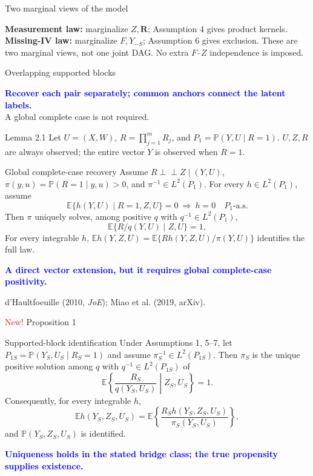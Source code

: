 \documentclass[aspectratio=169,10pt]{beamer}
\newcommand{\slidebody}{\fontsize{10.6pt}{12.6pt}\selectfont}
\newcommand{\slideannotation}{\fontsize{8pt}{9.6pt}\selectfont}
\renewcommand{\small}{\slidebody}
\renewcommand{\footnotesize}{\slidebody}
\newcommand{\E}{\mathbb E}
\newcommand{\Prb}{\mathbb P}
\newcommand{\indep}{\mathrel{\perp\!\!\!\perp}}
\newcommand{\bluekey}[1]{\textcolor{Blue}{\textbf{#1}}}
\newenvironment{theorembox}[1]{\begin{block}{#1}}{\end{block}}
\begin{document}
\begin{frame}{Two marginal views of the model}
\centering

\medskip
\raggedright
\textbf{Measurement law:} marginalize $Z,\bm R$; Assumption 4 gives product kernels.\\
\textbf{Missing-IV law:} marginalize $F,Y_{-S}$; Assumption 6 gives exclusion.
{\slideannotation These are two marginal views, not one joint DAG. No extra $F$--$Z$ independence is imposed.}
\end{frame}

\begin{frame}{Overlapping supported blocks}
\centering

\medskip
\bluekey{Recover each pair separately; common anchors connect the latent labels.}\\
A global complete case is not required.
\end{frame}



\begin{frame}{Lemma 2.1}
\small
Let $U=(X,W)$, $R=\prod_{j=1}^mR_j$, and $P_1=\Prb(Y,U\mid R=1)$.
$U,Z,R$ are always observed; the entire vector $Y$ is observed when $R=1$.
\begin{theorembox}{Global complete-case recovery}
Assume $R\indep Z\mid(Y,U)$, $\pi(y,u)=\Prb(R=1\mid y,u)>0$, and $\pi^{-1}\in L^2(P_1)$.
For every $h\in L^2(P_1)$, assume
\[
\E\{h(Y,U)\mid R=1,Z,U\}=0\ \Longrightarrow\ h=0\quad P_1\text{-a.s.}
\]
Then $\pi$ uniquely solves, among positive $q$ with $q^{-1}\in L^2(P_1)$,
\[
\E\{R/q(Y,U)\mid Z,U\}=1,
\]
For every integrable $h$, $\E h(Y,Z,U)=\E\{Rh(Y,Z,U)/\pi(Y,U)\}$ identifies the full law.
\end{theorembox}
\bluekey{A direct vector extension, but it requires global complete-case positivity.}
\par{\footnotesize d'Haultfoeuille (2010, \emph{JoE}); Miao et al. (2019, arXiv).}
\end{frame}

\begin{frame}{\textcolor{Red}{New!} Proposition 1}
\small
\begin{theorembox}{Supported-block identification}
Under Assumptions 1, 5--7, let $P_{1S}=\Prb(Y_S,U_S\mid R_S=1)$ and assume $\pi_S^{-1}\in L^2(P_{1S})$.
Then $\pi_S$ is the unique positive solution among $q$ with $q^{-1}\in L^2(P_{1S})$ of
\[
\E\left\{\frac{R_S}{q(Y_S,U_S)}\middle|Z_S,U_S\right\}=1.
\]
Consequently, for every integrable $h$,
\[
\E h(Y_S,Z_S,U_S)
=\E\left\{\frac{R_Sh(Y_S,Z_S,U_S)}{\pi_S(Y_S,U_S)}\right\},
\]
and $\Prb(Y_S,Z_S,U_S)$ is identified.
\end{theorembox}
\bluekey{Uniqueness holds in the stated bridge class; the true propensity supplies existence.}
\end{frame}
\end{document}
